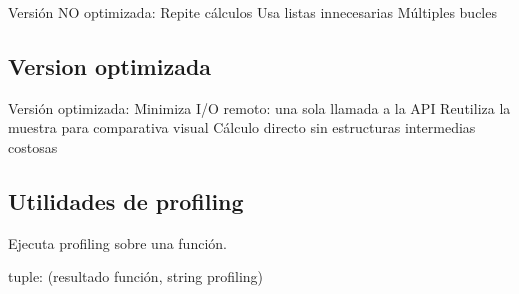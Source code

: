 \documentclass[letterpaper,10pt,spanish]{sphinxmanual}
\begin{document}
\begin{fulllineitems}
\label{\detokenize{modulos:no_opt.obtener_datos_no_opt}}
\pysigstartsignatures
\pysiglinewithargsret
{}
{}
{}
\pysigstopsignatures
\sphinxAtStartPar
Versión NO optimizada:
\sphinxhyphen{} Repite cálculos
\sphinxhyphen{} Usa listas innecesarias
\sphinxhyphen{} Múltiples bucles

\end{fulllineitems}



\subsection{Version optimizada}
\label{\detokenize{modulos:module-opt}}\label{\detokenize{modulos:version-optimizada}}

\begin{fulllineitems}
\label{\detokenize{modulos:opt.obtener_datos_opt}}
\pysigstartsignatures
\pysiglinewithargsret
{}
{}
{}
\pysigstopsignatures
\sphinxAtStartPar
Versión optimizada:
\sphinxhyphen{} Minimiza I/O remoto: una sola llamada a la API
\sphinxhyphen{} Reutiliza la muestra para comparativa visual
\sphinxhyphen{} Cálculo directo sin estructuras intermedias costosas

\end{fulllineitems}



\subsection{Utilidades de profiling}
\label{\detokenize{modulos:module-profiler_utils}}\label{\detokenize{modulos:utilidades-de-profiling}}

\begin{fulllineitems}
\label{\detokenize{modulos:profiler_utils.profile_function}}
\pysigstartsignatures
\pysiglinewithargsret
{}
{}
{}
\pysigstopsignatures
\sphinxAtStartPar
Ejecuta profiling sobre una función.
\begin{description}
\sphinxAtStartPar
tuple: (resultado función, string profiling)

\end{description}

\end{fulllineitems}
\end{document}

